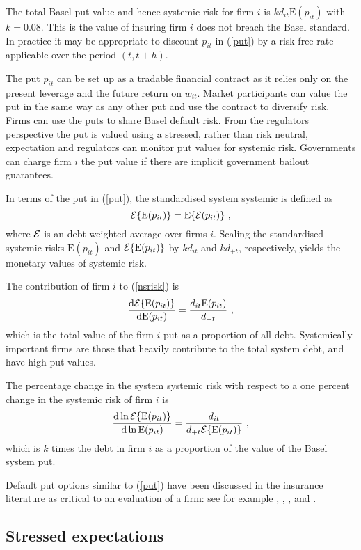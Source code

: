 \documentclass[authoryear]{elsarticle}
\newcommand{\E}{\mathrm{E}}
\newcommand{\Ex}{{\cal E}}
\newcommand{\de}{\mathrm{d}}
\newcommand{\eref}[1]{(\ref{#1})}
\newcommand{\be}[1]{\begin{equation}\label{#1}}
\newcommand{\ee}{\end{equation}}
\begin{document}
The total Basel put value and hence systemic risk for firm  $i$ is   $kd_{it}\E(p_{it})$ with $k=0.08$.   This is the value of insuring firm $i$ does not breach the Basel standard.  In practice it may be appropriate to discount $p_{it}$ in \eref{put} by a risk free rate applicable over the period $(t,t+h)$.        

The put $p_{it}$ can be set up as a tradable financial contract as it relies only on the present leverage and the future return on $w_{it}$.  Market participants can value the put in  the same way as any other put and use the contract to diversify risk.  Firms can use the puts to share Basel default risk.    From the regulators perspective  the put is valued using a stressed, rather than risk neutral, expectation and regulators can monitor put values for systemic risk. Governments can charge firm $i$ the put value if there are  implicit government bailout guarantees.

In terms of the put in \eref{put}, the standardised system systemic is defined as
\be{nsrisk}
\Ex\{\E(p_{it})\} = \E\{\Ex(p_{it})\}\ , 
\ee
where $\Ex$ is an debt weighted average over firms $i$.  Scaling the standardised systemic risks $\E(p_{it})$ and $\Ex\{\E(p_{it})\}$ by $kd_{it}$ and $kd_{+t}$, respectively, yields the monetary values of  systemic risk.



  The contribution of firm $i$ to \eref{nsrisk} is  
$$
\frac{\de \Ex\{\E(p_{it})\} }{\de \E(p_{it}) } = \frac{d_{it}\E(p_{it})}{d_{+t}}\ ,
$$
which is the total value of the firm $i$ put  as a proportion of all debt.  Systemically important firms are those that heavily contribute  to the total system debt, and have high put values.  

The percentage change in the system systemic risk with respect to a one percent change in the systemic risk of firm $i$ is
$$
\frac{\de \ln \Ex\{\E(p_{it})\} }{\de \ln \E(p_{it}) } = \frac{d_{it}}{d_{+t}\Ex\{\E(p_{it})\}}\ ,
$$
which is $k$ times  the  debt in firm $i$ as a proportion of the value of the Basel system put.

Default put options similar to \eref{put} have been discussed in the insurance literature as critical to an evaluation of a firm:  see for
example \citet{merton1977analytic}, \citet{doherty1986price}, \citet{cummins1988risk}, \citet{myers2001capital} and \citet{sherris2006solvency}.

\subsection{Stressed expectations}
\end{document}
